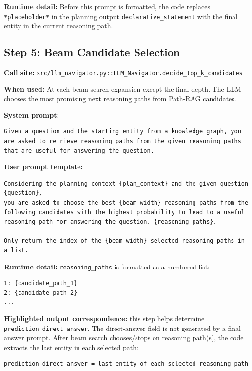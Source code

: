 \documentclass[11pt]{article}
\begin{document}
\textbf{Runtime detail:} Before this prompt is formatted, the code replaces
\texttt{*placeholder*} in the planning output \texttt{declarative\_statement}
with the final entity in the current reasoning path.

\subsection{Step 5: Beam Candidate Selection}

\textbf{Call site:} \texttt{src/llm\_navigator.py::LLM\_Navigator.decide\_top\_k\_candidates}

\textbf{When used:} At each beam-search expansion except the final depth. The LLM
chooses the most promising next reasoning paths from Path-RAG candidates.

\textbf{System prompt:}
\begin{lstlisting}[style=prompt]
Given a question and the starting entity from a knowledge graph, you are asked to retrieve reasoning paths from the given reasoning paths that are useful for answering the question.
\end{lstlisting}

\textbf{User prompt template:}
\begin{lstlisting}[style=prompt]
Considering the planning context {plan_context} and the given question {question}, 
you are asked to choose the best {beam_width} reasoning paths from the following candidates with the highest probability to lead to a useful reasoning path for answering the question. {reasoning_paths}. 

Only return the index of the {beam_width} selected reasoning paths in a list.
\end{lstlisting}

\textbf{Runtime detail:} \texttt{reasoning\_paths} is formatted as a numbered
list:

\begin{lstlisting}[style=prompt]
1: {candidate_path_1}
2: {candidate_path_2}
...
\end{lstlisting}

\textbf{Highlighted output correspondence:} this step helps determine
\texttt{prediction\_direct\_answer}. The direct-answer field is not generated by
a final answer prompt. After beam search chooses/stops on reasoning path(s), the
code extracts the last entity in each selected path:

\begin{lstlisting}[style=prompt]
prediction_direct_answer = last entity of each selected reasoning path
\end{lstlisting}
\end{document}
